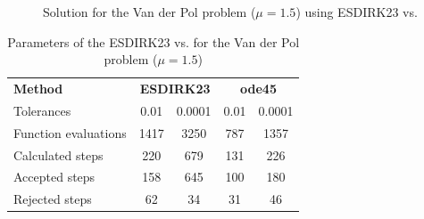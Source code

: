 \begin{figure}[H]
    \centering
    \caption{Solution for the Van der Pol problem ($\mathit{\mu = 1.5}$) using ESDIRK23 vs. }
    \label{8_6_mu_1_5}
\end{figure}

\begin{table}[H]
    \centering
    \begin{tabular}{@{}l|cc|cc@{}}
    \toprule
    \textbf{Method}      & \multicolumn{2}{c|}{\textbf{ESDIRK23}} & \multicolumn{2}{c}{\textbf{ode45}} \\
    Tolerances           & 0.01              & 0.0001             & 0.01            & 0.0001           \\ \midrule
    Function evaluations & 1417              & 3250               & 787             & 1357             \\
    Calculated steps     & 220               & 679                & 131             & 226              \\
    Accepted steps       & 158               & 645                & 100             & 180              \\
    Rejected steps       & 62                & 34                 & 31              & 46               \\ \bottomrule
    \end{tabular}
    \caption{Parameters of the ESDIRK23 vs.  for the Van der Pol problem ($\mathit{\mu = 1.5}$)}
    \label{8_6_adaptive_mu_1_5_table}
\end{table}

